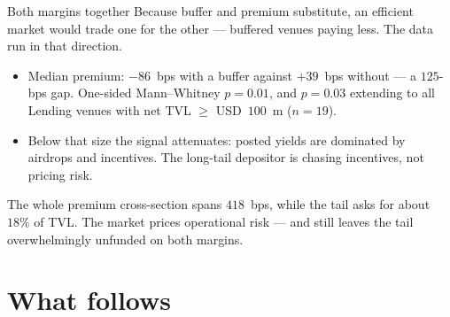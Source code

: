 \documentclass[10pt,xcolor=x11names,aspectratio=169]{beamer}
\begin{document}
\begin{frame}{Both margins together}
  Because buffer and premium substitute, an efficient market would trade one for
  the other --- buffered venues paying less. The data run in that direction.
  \begin{itemize}
    \item Median premium: $-86$~bps with a buffer against $+39$~bps without ---
          a $125$-bps gap. One-sided Mann--Whitney $p=0.01$, and
          $p=0.03$ extending to all Lending venues with net TVL
          $\ge$ USD~$100$~m ($n=19$).
    \item Below that size the signal attenuates: posted yields are dominated by
          airdrops and incentives. The long-tail depositor is chasing
          incentives, not pricing risk.
  \end{itemize}
  \begin{pitfall}
    The whole premium cross-section spans $418$~bps, while the tail asks for
    about $18\%$ of TVL. The market prices operational risk --- and still leaves
    the tail overwhelmingly unfunded on both margins.
  \end{pitfall}
\end{frame}

\section{What follows}
\end{document}
